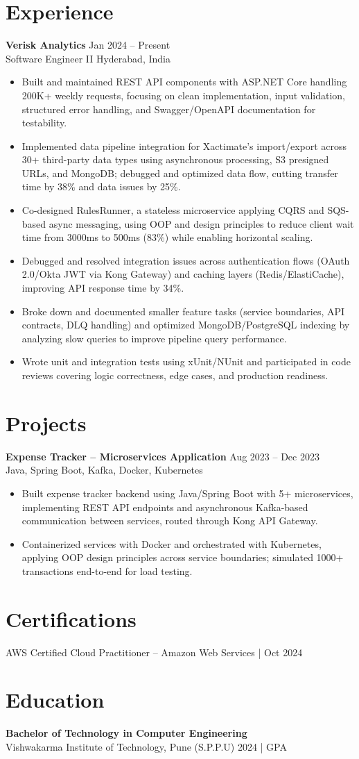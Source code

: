 \documentclass[10pt,letterpaper]{article}
\newcommand{\resumeSubheading}[4]{%
  \textbf{#1} \hfill #2 \\
  #3 \hfill #4 \\
}
\begin{document}
\section*{Experience}
\resumeSubheading{Verisk Analytics}{Jan 2024 -- Present}{Software Engineer II}{Hyderabad, India}
\begin{itemize}
    \item Built and maintained REST API components with ASP.NET Core handling 200K+ weekly requests, focusing on clean implementation, input validation, structured error handling, and Swagger/OpenAPI documentation for testability.
    \item Implemented data pipeline integration for Xactimate's import/export across 30+ third-party data types using asynchronous processing, S3 presigned URLs, and MongoDB; debugged and optimized data flow, cutting transfer time by 38\% and data issues by 25\%.
    \item Co-designed RulesRunner, a stateless microservice applying CQRS and SQS-based async messaging, using OOP and design principles to reduce client wait time from 3000ms to 500ms (83\%) while enabling horizontal scaling.
    \item Debugged and resolved integration issues across authentication flows (OAuth 2.0/Okta JWT via Kong Gateway) and caching layers (Redis/ElastiCache), improving API response time by 34\%.
    \item Broke down and documented smaller feature tasks (service boundaries, API contracts, DLQ handling) and optimized MongoDB/PostgreSQL indexing by analyzing slow queries to improve pipeline query performance.
    \item Wrote unit and integration tests using xUnit/NUnit and participated in code reviews covering logic correctness, edge cases, and production readiness.
\end{itemize}

\section*{Projects}
\resumeSubheading{Expense Tracker -- Microservices Application}{Aug 2023 -- Dec 2023}{}{Java, Spring Boot, Kafka, Docker, Kubernetes}
\begin{itemize}
    \item Built expense tracker backend using Java/Spring Boot with 5+ microservices, implementing REST API endpoints and asynchronous Kafka-based communication between services, routed through Kong API Gateway.
    \item Containerized services with Docker and orchestrated with Kubernetes, applying OOP design principles across service boundaries; simulated 1000+ transactions end-to-end for load testing.
\end{itemize}

\section*{Certifications}
AWS Certified Cloud Practitioner -- Amazon Web Services \enspace | \enspace Oct 2024

\section*{Education}
\resumeSubheading{Bachelor of Technology in Computer Engineering}{}{Vishwakarma Institute of Technology, Pune (S.P.P.U)}{2024 \enspace | \enspace 8.8 GPA}
\end{document}
